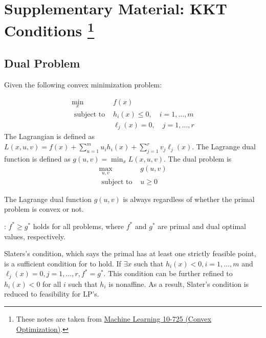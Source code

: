\section[Supplementary Material: KKT Conditions]{Supplementary Material: KKT Conditions \footnote{These notes are taken from \href{https://www.stat.cmu.edu/~ryantibs/convexopt/}{Machine Learning 10-725 (Convex Optimization)}.}}


\subsection{Dual Problem}

Given the following convex minimization problem:

\begin{problem}
    \label{pro:kkt-problem}
    \begin{equation}
\begin{array}{ll}
\min _{x} & f(x) \\
\text { subject to } & h_{i}(x) \leq 0, \quad i=1, \ldots, m \\
& \ell_{j}(x)=0, \quad j=1, \ldots, r
\end{array}
\end{equation}
The Lagrangian is defined as $ L(x, u, v)=f(x)+\sum_{u=1}^{m} u_{i} h_{i}(x)+\sum_{j=1}^{r} v_{j} \ell_{j}(x) . $ The Lagrange dual function is defined as $ g(u, v)=\min _{x} L(x, u, v) $. The dual problem is
\begin{equation}
\begin{array}{ll}
\max _{u, v} & g(u, v) \\
\text { subject to } & u \geq 0
\end{array}
\end{equation}
\end{problem}


The Lagrange dual function $ g(u, v) $ is always  regardless of whether the primal problem is convex or not.

: $ f^{*} \geq g^{*} $ holds for all problems, where $ f^{*} $ and $ g^{*} $ are primal and dual optimal values, respectively.

Slaters's condition, which says the primal has at least one strictly feasible point, is a sufficient condition for  to hold. If $ \exists x $ such that $ h_{i}(x)<0, i=1, \ldots, m $ and $ \ell_{j}(x)=0, j=1, \ldots, r, f^{*}=g^{*} $. This condition can be further refined to $ h_{i}(x)<0 $ for all $ i $ such that $ h_{i} $ is nonaffine. As a result, Slater's condition is reduced to feasibility for LP's.

